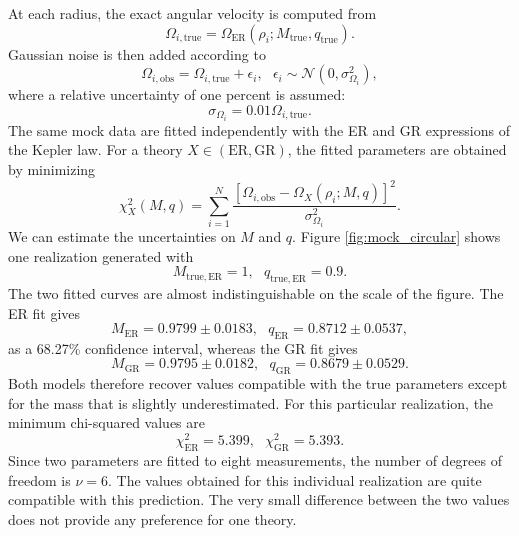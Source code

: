 \documentclass[floats,floatfix,aps, preprintnumbers,nofootinbib]{revtex4-2}
\newcommand{\mrm}{\mathrm}
\newcommand{\mcal}{\mathcal}
\begin{document}
At each radius, the exact angular velocity is computed from
\begin{equation}
\Omega_{i,\mrm{true}} = \Omega_{\mrm{ER}} \left(\rho_i; M_{\mrm{true}}, q_{\mrm{true}} \right).
\end{equation}
Gaussian noise is then added according to
\begin{equation}
\Omega_{i,\mrm{obs}} = \Omega_{i,\mrm{true}} + \epsilon_i, \ \ \ \epsilon_i \sim \mcal N\left(0,\sigma_{\Omega_i}^2\right),
\end{equation}
where a relative uncertainty of one percent is assumed:
\begin{equation}
\sigma_{\Omega_i} = 0.01\Omega_{i,\mrm{true}}.
\end{equation}
The same mock data are fitted independently with the ER and GR expressions of the Kepler law. For a theory $X\in(\mrm{ER},\mrm{GR})$, the fitted parameters are obtained by minimizing
\begin{equation}\label{chi2Circular}
\chi_X^2(M,q) = \sum_{i=1}^{N}\frac{\left[\Omega_{i,\mrm{obs}} - \Omega_X(\rho_i;M,q) \right]^2}{\sigma_{\Omega_i}^2}.
\end{equation}
We can estimate the uncertainties on $M$ and $q$. Figure \ref{fig:mock_circular} shows one realization generated with
\begin{equation}
M_{\mrm{true,ER}}=1,\ \ \ q_{\mrm{true,ER}}=0.9.
\end{equation}
The two fitted curves are almost indistinguishable on the scale of the figure. The ER fit gives
\begin{equation}
M_{\mrm{ER}} = 0.9799\pm0.0183,\ \ \ q_{\mrm{ER}} = 0.8712\pm0.0537,
\end{equation}
as a 68.27\% confidence interval, whereas the GR fit gives
\begin{equation}
M_{\mrm{GR}} = 0.9795\pm0.0182,\ \ \ q_{\mrm{GR}} = 0.8679\pm0.0529.
\end{equation}
Both models therefore recover values compatible with the true parameters except for the mass that is slightly underestimated. For this particular realization, the minimum chi-squared values are
\begin{equation}
\chi_{\mrm{ER}}^2=5.399,\ \ \ \chi_{\mrm{GR}}^2=5.393.
\end{equation}
Since two parameters are fitted to eight measurements, the number of degrees of freedom is $\nu=6$. The values obtained for this individual realization are quite compatible with this prediction. The very small difference between the two values does not provide any preference for one theory.
\end{document}
